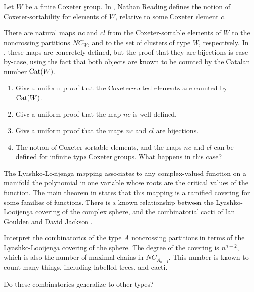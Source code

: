 \documentclass[12pt,letterpaper, reqno]{amsart}
\newcommand{\Cat}{{\rm Cat}}
\begin{document}
\begin{problemblock}Let $W$ be a finite Coxeter group. In \cite{reading}, Nathan Reading defines the notion of {\sf Coxeter-sortability} for elements of $W$, relative to some Coxeter element $c$.

There are natural maps $nc$ and $cl$ from the Coxeter-sortable elements of $W$ to the noncrossing partitions $NC_W$, and to the set of clusters of type $W$, respectively. In \cite{reading}, these maps are concretely defined, but the proof that they are bijections is case-by-case, using the fact that both objects are known to be counted by the Catalan number $\Cat(W)$.

\begin{problem}\label{prob:c-sorted}
\begin{enumerate}
\item Give a uniform proof that the Coxeter-sorted elements are counted by $\Cat(W)$.
\item Give a uniform proof that the map $nc$ is well-defined.
\item Give a uniform proof that the maps $nc$ and $cl$ are bijections.
\item The notion of Coxeter-sortable elements, and the maps $nc$ and $cl$ can be defined for infinite type Coxeter groups. What happens in this case?
\end{enumerate}

\end{problem}

\end{problemblock}

\begin{problemblock}

The Lyashko-Looijenga mapping associates to any complex-valued function on a manifold the polynomial in one variable whose roots are the critical values of the function. The main theorem in \cite{looijenga} states that this mapping is a ramified covering for some families of functions. There is a known relationship between the Lyashko-Looijenga covering of the complex sphere, and the combinatorial cacti of Ian Goulden and David Jackson \cite{goulden-jackson}.

Interpret the combinatorics of the type $A$ noncrossing partitions in terms of the Lyashko-Looijenga covering of the sphere. The degree of the covering is $n^{n-2}$, which is also the number of maximal chains in $NC_{A_{n-1}}$. This number is known to count many things, including labelled trees, and cacti.

\begin{problem}Do these combinatorics generalize to other types?\end{problem}

\end{problemblock}
\end{document}
